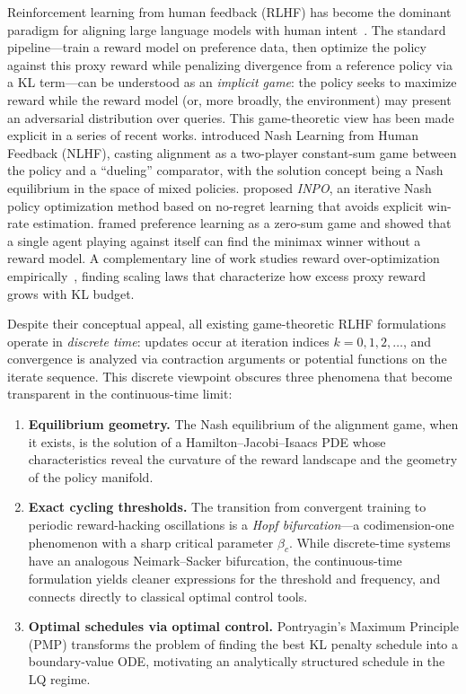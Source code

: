 \documentclass[10pt]{article}
\begin{document}
Reinforcement learning from human feedback (RLHF) has become the dominant paradigm for aligning large language models with human intent~\citep{ouyang2022training,bai2022training}.
The standard pipeline---train a reward model on preference data, then optimize the policy against this proxy reward while penalizing divergence from a reference policy via a KL term---can be understood as an \emph{implicit game}: the policy seeks to maximize reward while the reward model (or, more broadly, the environment) may present an adversarial distribution over queries.
This game-theoretic view has been made explicit in a series of recent works.
\citet{munos2024nash} introduced Nash Learning from Human Feedback (NLHF), casting alignment as a two-player constant-sum game between the policy and a ``dueling'' comparator, with the solution concept being a Nash equilibrium in the space of mixed policies.
\citet{inpo2025} proposed \emph{INPO}, an iterative Nash policy optimization method based on no-regret learning that avoids explicit win-rate estimation.
\citet{starlhf2024} framed preference learning as a zero-sum game and showed that a single agent playing against itself can find the minimax winner without a reward model.
A complementary line of work studies reward over-optimization empirically~\citep{gao2023scaling}, finding scaling laws that characterize how excess proxy reward grows with KL budget.

Despite their conceptual appeal, all existing game-theoretic RLHF formulations operate in \emph{discrete time}: updates occur at iteration indices $k = 0, 1, 2, \ldots$, and convergence is analyzed via contraction arguments or potential functions on the iterate sequence.
This discrete viewpoint obscures three phenomena that become transparent in the continuous-time limit:
\begin{enumerate}[leftmargin=1.5em,itemsep=1pt,topsep=2pt]
  \item \textbf{Equilibrium geometry.} The Nash equilibrium of the alignment game, when it exists, is the solution of a Hamilton--Jacobi--Isaacs PDE whose characteristics reveal the curvature of the reward landscape and the geometry of the policy manifold.
  \item \textbf{Exact cycling thresholds.} The transition from convergent training to periodic reward-hacking oscillations is a \emph{Hopf bifurcation}---a codimension-one phenomenon with a sharp critical parameter $\beta_c$. While discrete-time systems have an analogous Neimark--Sacker bifurcation, the continuous-time formulation yields cleaner expressions for the threshold and frequency, and connects directly to classical optimal control tools.
  \item \textbf{Optimal schedules via optimal control.} Pontryagin's Maximum Principle (PMP) transforms the problem of finding the best KL penalty schedule into a boundary-value ODE, motivating an analytically structured schedule in the LQ regime.
\end{enumerate}
\end{document}
